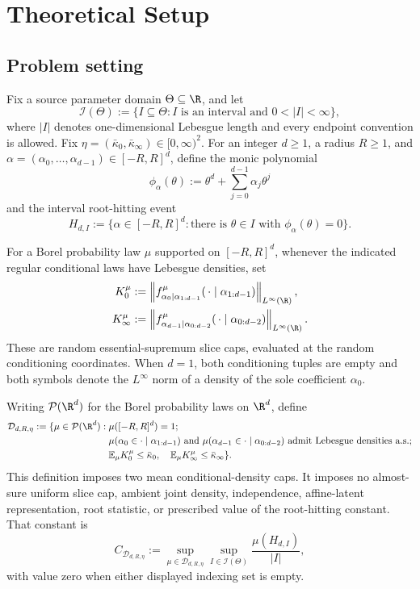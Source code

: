\section{Theoretical Setup}

\subsection{Problem setting}

Fix a source parameter domain $\Theta\subseteq\R$, and let
\[
\mathcal I(\Theta)
:=\{I\subseteq\Theta:I\text{ is an interval and }0<|I|<\infty\},
\]
where $|I|$ denotes one-dimensional Lebesgue length and every endpoint
convention is allowed.  Fix
$\eta=(\bar\kappa_0,\bar\kappa_\infty)\in[0,\infty)^2$.  For an integer
$d\geq1$, a radius $R\geq1$, and
$\alpha=(\alpha_0,\ldots,\alpha_{d-1})\in[-R,R]^d$, define the monic
polynomial
\[
\phi_\alpha(\theta)
:=\theta^d+\sum_{j=0}^{d-1}\alpha_j\theta^j
\]
and the interval root-hitting event
\[
H_{d,I}:=\{\alpha\in[-R,R]^d:\text{there is }\theta\in I
\text{ with }\phi_\alpha(\theta)=0\}.
\]

For a Borel probability law $\mu$ supported on $[-R,R]^d$, whenever the
indicated regular conditional laws have Lebesgue densities, set
\[
\begin{aligned}
K_0^\mu
&:=\left\|f^\mu_{\alpha_0\mid\alpha_{1:d-1}}
  (\,\cdot\mid\alpha_{1:d-1})\right\|_{L^\infty(\R)},\\
K_\infty^\mu
&:=\left\|f^\mu_{\alpha_{d-1}\mid\alpha_{0:d-2}}
  (\,\cdot\mid\alpha_{0:d-2})\right\|_{L^\infty(\R)}.
\end{aligned}
\]
These are random essential-supremum slice caps, evaluated at the random
conditioning coordinates.  When $d=1$, both conditioning tuples are empty
and both symbols denote the $L^\infty$ norm of a density of the sole
coefficient $\alpha_0$.

Writing $\mathcal P(\R^d)$ for the Borel probability laws on $\R^d$, define
\[
\begin{aligned}
\mathcal D_{d,R,\eta}:=\{\mu\in\mathcal P(\R^d):\;&
\mu([-R,R]^d)=1;\\
&\mu(\alpha_0\in\cdot\mid\alpha_{1:d-1})\text{ and }
\mu(\alpha_{d-1}\in\cdot\mid\alpha_{0:d-2})
\text{ admit Lebesgue densities a.s.};\\
&\mathbb E_\mu K_0^\mu\leq\bar\kappa_0,
\quad \mathbb E_\mu K_\infty^\mu\leq\bar\kappa_\infty\}.
\end{aligned}
\]
This definition imposes two mean conditional-density caps.  It imposes no
almost-sure uniform slice cap, ambient joint density, independence,
affine-latent representation, root statistic, or prescribed value of the
root-hitting constant.  That constant is
\[
C_{\mathcal D_{d,R,\eta}}
:=\sup_{\mu\in\mathcal D_{d,R,\eta}}
  \sup_{I\in\mathcal I(\Theta)}
  \frac{\mu(H_{d,I})}{|I|},
\]
with value zero when either displayed indexing set is empty.

